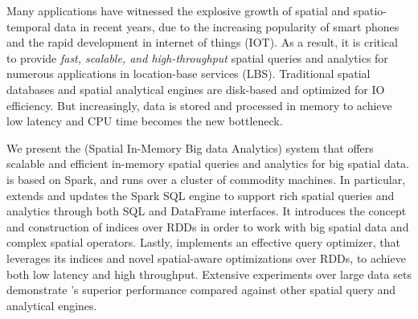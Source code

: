 Many applications have witnessed the explosive growth of spatial and
spatio-temporal data in recent years, due to the increasing popularity
of smart phones and the rapid development in internet of things (IOT).
As a result, it is critical to provide {\em fast, scalable, and
high-throughput} spatial queries and analytics for numerous
applications in location-base services (LBS). Traditional spatial
databases and spatial analytical engines are disk-based and optimized
for IO efficiency. But increasingly, data is stored and processed in
memory to achieve low latency and CPU time becomes the new bottleneck.


We present the \name (Spatial In-Memory Big data Analytics) system
that offers scalable and efficient in-memory spatial queries and
analytics for big spatial data. \name is based on Spark, and runs over
a cluster of commodity machines. In particular, \name extends and
updates the Spark SQL engine to support rich spatial queries and
analytics through both SQL and DataFrame interfaces. It introduces the
concept and construction of indices over RDDs in order to work with
big spatial data and complex spatial operators. Lastly, \name
implements an effective query optimizer, that leverages its indices
and novel spatial-aware optimizations over RDDs, to achieve both low
latency and high throughput. Extensive experiments over large data
sets demonstrate \name's superior performance compared against other
spatial query and analytical engines.


